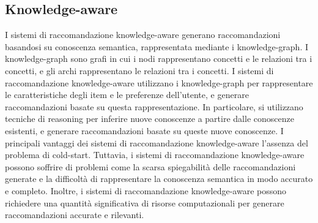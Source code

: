 \subsection{Knowledge-aware}
I sistemi di raccomandazione knowledge-aware generano raccomandazioni basandosi su conoscenza semantica, rappresentata mediante i knowledge-graph. I knowledge-graph sono grafi in cui i nodi rappresentano concetti e le relazioni tra i concetti, e gli archi rappresentano le relazioni tra i concetti. I sistemi di raccomandazione knowledge-aware utilizzano i knowledge-graph per rappresentare le caratteristiche degli item e le preferenze dell'utente, e generare raccomandazioni basate su questa rappresentazione. In particolare, si utilizzano tecniche di reasoning per inferire nuove conoscenze a partire dalle conoscenze esistenti, e generare raccomandazioni basate su queste nuove conoscenze. I principali vantaggi dei sistemi di raccomandazione knowledge-aware l'assenza del problema di cold-start. Tuttavia, i sistemi di raccomandazione knowledge-aware possono soffrire di problemi come la scarsa spiegabilità delle raccomandazioni generate e la difficoltà di rappresentare la conoscenza semantica in modo accurato e completo. Inoltre, i sistemi di raccomandazione knowledge-aware possono richiedere una quantità significativa di risorse computazionali per generare raccomandazioni accurate e rilevanti.\\

